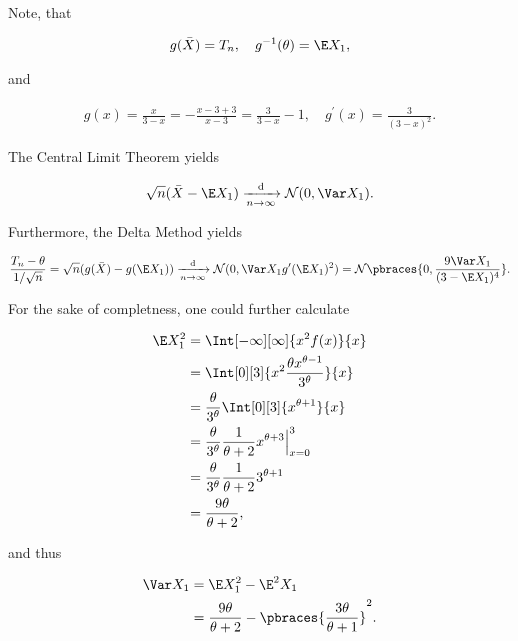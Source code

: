 \begin{solution}
\begin{enumerate}[label = (\alph*)]
    Note, that

    \begin{align*}
        g(\bar X) = T_n,
        \quad
        g^{-1}(\theta) = \E X_1,
    \end{align*}

    and

    \begin{align*}
        g(x) = \frac{x}{3 - x} = -\frac{x - 3 + 3}{x - 3} = \frac{3}{3 - x} - 1,
        \quad
        g^\prime(x) = \frac{3}{(3 - x)^2}.
    \end{align*}

    The Central Limit Theorem \cite[lecture 4, slide 61]{EStat} yields

    \begin{align*}
        \sqrt n (\bar X - \E X_1)
        \xrightarrow[n \to \infty]{\text d}
        \mathcal N(0, \Var X_1).
    \end{align*}

    Furthermore, the Delta Method \cite[lecture 5, slide 10]{EStat} yields

    \begin{align*}
        \frac{T_n - \theta}{1 / \sqrt n}
        =
        \sqrt n (g(\bar X) - g(\E X_1))
        \xrightarrow[n \to \infty]{\text d}
        \mathcal N(0, \Var X_1 g^\prime(\E X_1)^2)
        =
        \mathcal N \pbraces{0, \frac{9 \Var X_1}{(3 - \E X_1)^4}}.
    \end{align*}

    For the sake of completness, one could further calculate

    \begin{align*}
        \E X_1^2
        & =
        \Int[-\infty][\infty]
        {
            x^2 f(x)
        }{x} \\
        & =
        \Int[0][3]
        {
            x^2 \frac{\theta x^{\theta - 1}}{3^\theta}
        }{x} \\
        & =
        \frac{\theta}{3^\theta}
        \Int[0][3]
        {
            x^{\theta + 1}
        }{x} \\
        & =
        \frac{\theta}{3^\theta}
        \frac{1}{\theta + 2}
        x^{\theta + 3} \Big |_{x=0}^3 \\
        & =
        \frac{\theta}{3^\theta}
        \frac{1}{\theta + 2}
        3^{\theta + 1} \\
        & =
        \frac{9 \theta}{\theta + 2},
    \end{align*}

    and thus

    \begin{align*}
        \Var X_1
        & =
        \E X_1^2 - \E^2 X_1 \\
        & =
        \frac{9 \theta}{\theta + 2}
        -
        \pbraces
        {
            \frac{3 \theta}{\theta + 1}
        }^2.
    \end{align*}

\end{enumerate}

\end{solution}

